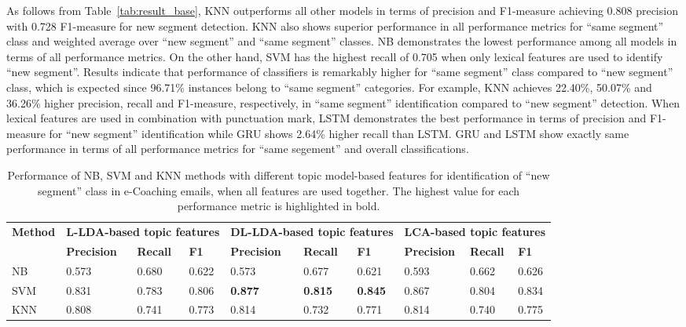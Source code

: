 \documentclass{amia}
\begin{document}
As follows from Table~\ref{tab:result_base}, KNN outperforms all other models in terms of precision and F1-measure achieving 0.808 precision with 0.728 F1-measure for new segment detection. KNN also shows superior performance in all performance metrics for ``same segment'' class and weighted average over ``new segment'' and ``same segment'' classes. NB demonstrates the lowest performance among all models in terms of all performance metrics. On the other hand, SVM has the highest recall of 0.705 when only lexical features are used to identify ``new segment''. Results indicate that performance of classifiers is remarkably higher for ``same segment'' class compared to ``new segment'' class, which is expected since 96.71\% instances belong to ``same segment'' categories. For example, KNN achieves 22.40\%, 50.07\% and 36.26\% higher precision, recall and F1-measure, respectively, in ``same segment'' identification compared to ``new segment'' detection. When lexical features are used in combination with punctuation mark, LSTM demonstrates the best performance in terms of precision and F1-measure for ``new segment'' identification while GRU shows 2.64\% higher recall than LSTM. GRU and LSTM show exactly same performance in terms of all performance metrics for ``same segement'' and overall classifications. \\  

\begin{table}[ht]
\centering
\caption{Performance of NB, SVM and KNN methods with different topic model-based features for identification of ``new segment'' class in e-Coaching emails, when all features are used together. The highest value for each performance metric is highlighted in bold.}
\label{tab:result_boundary}
  \begin{tabular}{|l|l|l|l|l|l|l|l|l|l|}
  \hline
   \multirow{2}{*}{\textbf{Method}} & \multicolumn{3}{|c|}{\textbf{L-LDA-based topic features}} & \multicolumn{3}{|c|}{\textbf{DL-LDA-based topic features}}  & \multicolumn{3}{|c|}{\textbf{LCA-based topic features}} \\\cline{2-10} & \textbf{Precision}  & \textbf{Recall} & \textbf{F1} & \textbf{Precision}  & \textbf{Recall} & \textbf{F1} & \textbf{Precision}  & \textbf{Recall} & \textbf{F1}\\ \hline  
    
 NB & 0.573 & 0.680 & 0.622 & 0.573 & 0.677 & 0.621 & 0.593 & 0.662 & 0.626 \\ \hline
 SVM & 0.831 & 0.783 & 0.806 & \textbf{0.877} & \textbf{0.815} & \textbf{0.845} & 0.867 & 0.804 & 0.834  \\ \hline
 KNN & 0.808 & 0.741 & 0.773 & 0.814 & 0.732 & 0.771 & 0.814 & 0.740 & 0.775 \\ \hline
  \end{tabular}
\end{table} 
\end{document}
